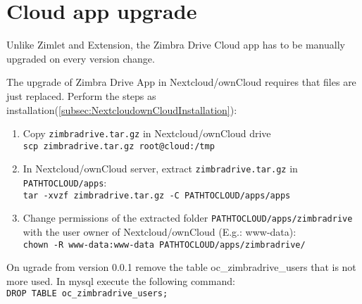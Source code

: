 \section{Cloud app upgrade}
Unlike Zimlet and Extension, the Zimbra Drive Cloud app has to be manually upgraded on every version change.

The upgrade of Zimbra Drive App in Nextcloud/ownCloud requires that files are just replaced.
Perform the steps as installation(\ref{subsec:NextcloudownCloudInstallation}):
    \begin{enumerate}
        \item Copy \texttt{zimbradrive.tar.gz} in Nextcloud/ownCloud drive\\ 
        \texttt{scp zimbradrive.tar.gz root@cloud:/tmp}

        \item In Nextcloud/ownCloud server, extract \texttt{zimbradrive.tar.gz}  in \texttt{PATH\textunderscore TO\textunderscore CLOUD/apps}:\\
        \texttt{tar -xvzf zimbradrive.tar.gz -C \texttt{PATH\textunderscore TO\textunderscore CLOUD/apps}/apps}

        \item Change permissions of the extracted folder \texttt{PATH\textunderscore TO\textunderscore CLOUD/apps/zimbradrive}
        with the user owner of Nextcloud/ownCloud (E.g.: www-data):\\
        \texttt{chown -R www-data:www-data PATH\textunderscore TO\textunderscore CLOUD/apps/zimbradrive/}
    \end{enumerate}

\begin{warning}
    On ugrade from version 0.0.1 remove the table oc\_zimbradrive\_users that is not more used. In mysql execute the following command:\\
    \texttt{DROP TABLE oc\_zimbradrive\_users;}
\end{warning}
